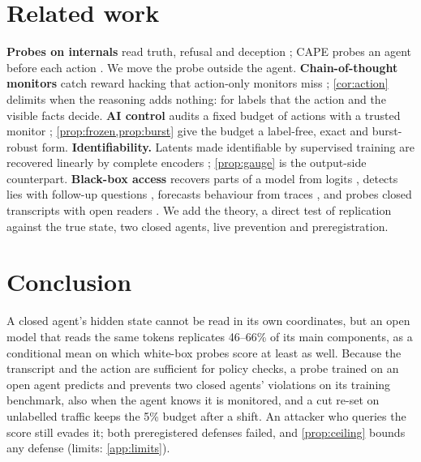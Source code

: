 \documentclass{article}
\theoremstyle{plain}
\theoremstyle{definition}
\begin{document}
\section{Related work}
\label{sec:related}
\textbf{Probes on internals} read truth, refusal and deception \citep{burns2023ccs,marks2023geometry,zou2023repe,arditi2024refusal,goldowskydill2025probes}; CAPE probes an agent before each action \citep{fayyazi2026cape}. We move the probe outside the agent.
\textbf{Chain-of-thought monitors} catch reward hacking that action-only monitors miss \citep{baker2025monitoring,korbak2025cot,chen2025reasoning}; \cref{cor:action} delimits when the reasoning adds nothing: for labels that the action and the visible facts decide.
\textbf{AI control} audits a fixed budget of actions with a trusted monitor \citep{greenblatt2024control}; \cref{prop:frozen,prop:burst} give the budget a label-free, exact and burst-robust form.
\textbf{Identifiability.} Latents made identifiable by supervised training are recovered linearly by complete encoders \citep{zhou2026identifiabilities}; \cref{prop:gauge} is the output-side counterpart.
\textbf{Black-box access} recovers parts of a model from logits \citep{carlini2024stealing,finlayson2024logits}, detects lies with follow-up questions \citep{pacchiardi2024liar,cooney2026didyoulie,sam2025quere}, forecasts behaviour from traces \citep{levy2026forecasting}, and probes closed transcripts with open readers \citep{conti2026hermeneutics}. We add the theory, a direct test of replication against the true state, two closed agents, live prevention and preregistration.

\section{Conclusion}
A closed agent's hidden state cannot be read in its own coordinates, but an open model that reads the same tokens replicates 46--66\% of its main components, as a conditional mean on which white-box probes score at least as well. Because the transcript and the action are sufficient for policy checks, a probe trained on an open agent predicts and prevents two closed agents' violations on its training benchmark, also when the agent knows it is monitored, and a cut re-set on unlabelled traffic keeps the 5\% budget after a shift. An attacker who queries the score still evades it; both preregistered defenses failed, and \cref{prop:ceiling} bounds any defense (limits: \cref{app:limits}).
\end{document}
